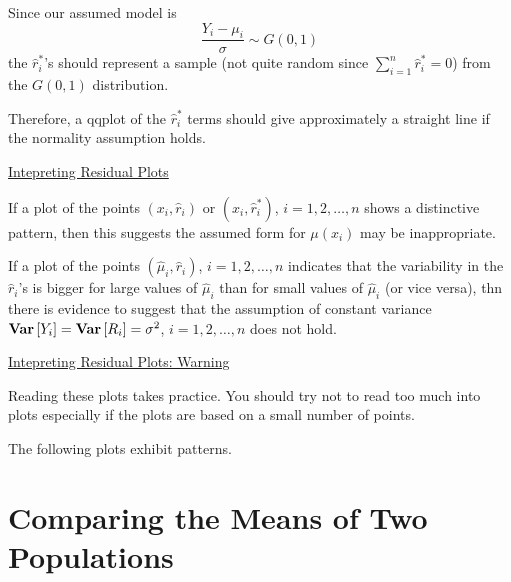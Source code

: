 Since our assumed model is
\[ \frac{Y_i-\mu_i}{\sigma}\sim G(0,1)  \]
the $ \hat{r}_i^* $'s should represent a sample (not quite random since $ \sum\limits_{i=1}^{n} \hat{r}_i^* =0 $)
from the $ G(0,1) $ distribution.

Therefore, a qqplot of the $ \hat{r}_i^* $ terms should give approximately a straight line if the normality
assumption holds.

\underline{Intepreting Residual Plots}

If a plot of the points $ (x_i,\hat{r}_i) $ or $ (x_i,\hat{r}_i^*) $, $ i=1,2,\ldots ,n $
shows a distinctive pattern, then this suggests the assumed form for $ \mu(x_i) $ may be inappropriate.

If a plot of the points $ \left( \hat{\mu}_i,\hat{r}_i \right) $, $ i=1,2,\ldots ,n $
indicates that the variability in the $ \hat{r}_i $'s is bigger for large values of $ \hat{\mu}_i $
than for small values of $ \hat{\mu}_i $ (or vice versa), thn there is evidence to suggest
that the assumption of constant variance $ \bm{\mathrm{Var}}\left[Y_i\right]=\bm{\mathrm{Var}}\left[R_i\right]=\sigma^2 $, $ i=1,2,\ldots ,n $
does not hold.

\underline{Intepreting Residual Plots: Warning}

Reading these plots takes practice. You should try not to read too much into plots especially
if the plots are based on a small number of points.

The following plots exhibit patterns.

\section{Comparing the Means of Two Populations}

